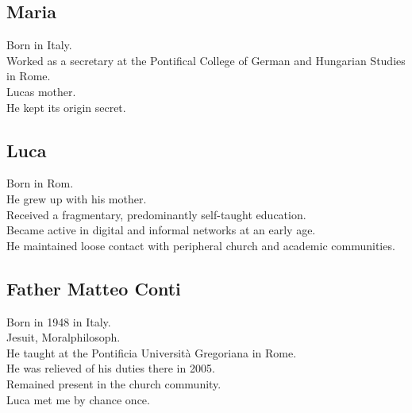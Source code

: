 \documentclass[
]{article}
\begin{document}
\subsection{Maria}\label{maria}

Born in Italy.\\
Worked as a secretary at the Pontifical College of German and Hungarian Studies in Rome.\\
Luca\textquotesingle s mother.\\
He kept its origin secret.

\subsection{Luca}\label{luca}

Born in Rom.\\
He grew up with his mother.\\
Received a fragmentary, predominantly self-taught education.\\
Became active in digital and informal networks at an early age.\\
He maintained loose contact with peripheral church and academic communities.

\subsection{Father Matteo Conti}\label{father-matteo-conti}

Born in 1948 in Italy.\\
Jesuit, Moralphilosoph.\\
He taught at the Pontificia Università Gregoriana in Rome.\\
He was relieved of his duties there in 2005.\\
Remained present in the church community.\\
Luca met me by chance once.
\end{document}
